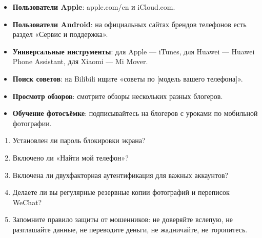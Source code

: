 

\begin{itemize}
  \item \textbf{Пользователи Apple}: apple.com/cn и iCloud.com.
  \item \textbf{Пользователи Android}: на официальных сайтах брендов телефонов есть раздел «Сервис и поддержка».
  \item \textbf{Универсальные инструменты}: для Apple — iTunes, для Huawei — Huawei Phone Assistant, для Xiaomi — Mi Mover.
\end{itemize}


\begin{itemize}
  \item \textbf{Поиск советов}: на Bilibili ищите «советы по [модель вашего телефона]».
  \item \textbf{Просмотр обзоров}: смотрите обзоры нескольких разных блогеров.
  \item \textbf{Обучение фотосъёмке}: подписывайтесь на блогеров с уроками по мобильной фотографии.
\end{itemize}


\begin{enumerate}
  \item Установлен ли пароль блокировки экрана?
  \item Включено ли «Найти мой телефон»?
  \item Включена ли двухфакторная аутентификация для важных аккаунтов?
  \item Делаете ли вы регулярные резервные копии фотографий и переписок WeChat?
  \item Запомните правило защиты от мошенников: не доверяйте вслепую, не разглашайте данные, не переводите деньги, не жадничайте, не торопитесь.
\end{enumerate}
